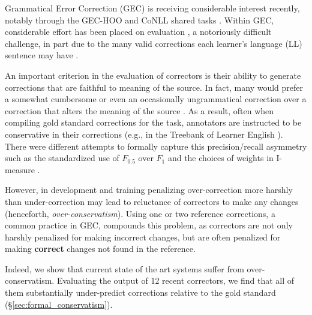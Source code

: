 \documentclass[letterpaper, 11pt]{article}
\begin{document}
%
Grammatical Error Correction (GEC) is receiving considerable
interest recently, notably through the GEC-HOO \cite{dale2011helping,dale2012hoo} and
CoNLL shared tasks \cite{kao2013conll,ng2014conll}.
Within GEC, considerable effort has been placed on evaluation
\cite{tetreault2008native,madnani2011they,felice2015towards,napoles2015ground},
a notoriously difficult challenge, in part due to the many valid corrections each learner's language (LL) sentence may
have \cite{chodorow2012problems}.

An important criterion in the evaluation of correctors
is their ability to generate corrections that are faithful to meaning of the source.
In fact, many would prefer a somewhat cumbersome or even an occasionally ungrammatical
correction over a correction that alters the meaning of the source \cite{brockett2006correcting}.
As a result, often when compiling gold standard corrections for the task,
annotators are instructed to be conservative in their corrections
(e.g., in the Treebank of Learner English \cite{nicholls2003cambridge}).
There were different attempts to formally capture this precision/recall asymmetry such as the standardized use of $F_{0.5}$ over $F_{1}$ \cite{dahlmeier2012better} and the choices of weights in I-measure \cite{felice2015towards}.

However, in development and training penalizing over-correction more harshly than under-correction
may lead to reluctance of correctors to
make any changes (henceforth, {\it over-conservatism}).
Using one or two reference corrections, a common practice in GEC,
compounds this problem, as correctors are not only harshly penalized for making incorrect changes,
but are often penalized for making {\bf correct} changes not found in the reference.

Indeed, we show that current state of the art systems suffer from over-conservatism.
Evaluating the output of 12 recent correctors, we find that all of them
substantially under-predict corrections relative to the gold standard (\S \ref{sec:formal_conservatism}).
\end{document}
